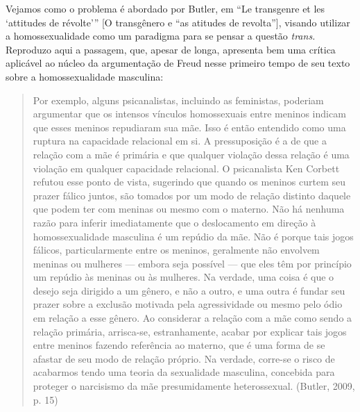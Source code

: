 Vejamos como o problema é abordado por Butler, em ``Le transgenre et les
`attitudes de révolte''' {[}O transgênero e ``as atitudes de
revolta''{]}, visando utilizar a homossexualidade como um paradigma para
se pensar a questão \emph{trans.} Reproduzo aqui a passagem, que, apesar
de longa, apresenta bem uma crítica aplicável ao núcleo da argumentação
de Freud nesse primeiro tempo de seu texto sobre a homossexualidade
masculina:

\begin{quote}
Por exemplo, alguns psicanalistas, incluindo as feministas, poderiam
argumentar que os intensos vínculos homossexuais entre meninos indicam
que esses meninos repudiaram sua mãe. Isso é então entendido como uma
ruptura na capacidade relacional em si. A pressuposição é a de que a
relação com a mãe é primária e que qualquer violação dessa relação é uma
violação em qualquer capacidade relacional. O psicanalista Ken Corbett
refutou esse ponto de vista, sugerindo que quando os meninos curtem seu
prazer fálico juntos, são tomados por um modo de relação distinto
daquele que podem ter com meninas ou mesmo com o materno. Não há nenhuma
razão para inferir imediatamente que o deslocamento em direção à
homossexualidade masculina é um repúdio da mãe. Não é porque tais jogos
fálicos, particularmente entre os meninos, geralmente não envolvem
meninas ou mulheres --- embora seja possível --- que eles têm por
princípio um repúdio às meninas ou às mulheres. Na verdade, uma coisa é
que o desejo seja dirigido a um gênero, e não a outro, e uma outra é
fundar seu prazer sobre a exclusão motivada pela agressividade ou mesmo
pelo ódio em relação a esse gênero. Ao considerar a relação com a mãe
como sendo a relação primária, arrisca-se, estranhamente, acabar por
explicar tais jogos entre meninos fazendo referência ao materno, que é
uma forma de se afastar de seu modo de relação próprio. Na verdade,
corre-se o risco de acabarmos tendo uma teoria da sexualidade masculina,
concebida para proteger o narcisismo da mãe presumidamente
heterossexual. (Butler, 2009, p. 15)
\end{quote}

